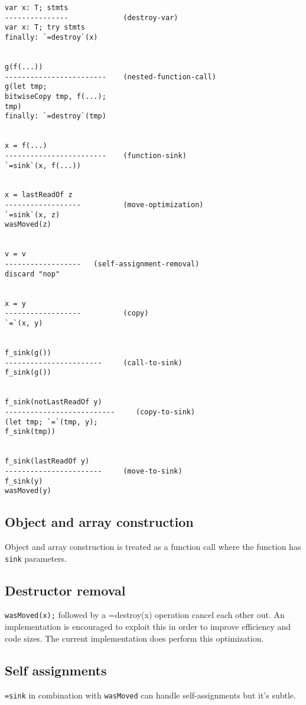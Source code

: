 \begin{verbatim}
var x: T; stmts
---------------             (destroy-var)
var x: T; try stmts
finally: `=destroy`(x)


g(f(...))
------------------------    (nested-function-call)
g(let tmp;
bitwiseCopy tmp, f(...);
tmp)
finally: `=destroy`(tmp)


x = f(...)
------------------------    (function-sink)
`=sink`(x, f(...))


x = lastReadOf z
------------------          (move-optimization)
`=sink`(x, z)
wasMoved(z)


v = v
------------------   (self-assignment-removal)
discard "nop"


x = y
------------------          (copy)
`=`(x, y)


f_sink(g())
-----------------------     (call-to-sink)
f_sink(g())


f_sink(notLastReadOf y)
--------------------------     (copy-to-sink)
(let tmp; `=`(tmp, y);
f_sink(tmp))


f_sink(lastReadOf y)
-----------------------     (move-to-sink)
f_sink(y)
wasMoved(y)
\end{verbatim}

\hypertarget{object-and-array-construction}{%
\subsection{Object and array
construction}\label{object-and-array-construction}}

Object and array construction is treated as a function call where the
function has \texttt{sink} parameters.

\hypertarget{destructor-removal}{%
\subsection{Destructor removal}\label{destructor-removal}}

\texttt{wasMoved(x);} followed by a {=destroy(x)} operation cancel each
other out. An implementation is encouraged to exploit this in order to
improve efficiency and code sizes. The current implementation does
perform this optimization.

\hypertarget{self-assignments}{%
\subsection{Self assignments}\label{self-assignments}}

\texttt{=sink} in combination with \texttt{wasMoved} can handle
self-assignments but it's subtle.

